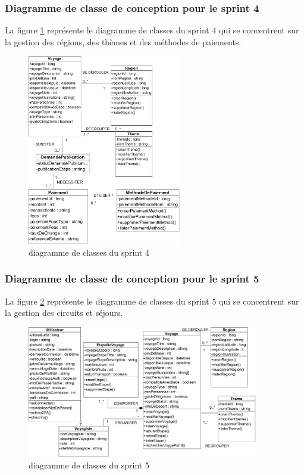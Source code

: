 \documentclass[12pt]{report}
\begin{document}
			\subsubsection{Diagramme de classe de conception pour le sprint 4}
				
			\hspace{15pt} La figure \ref{fig:sprint4} représente le diagramme de classes du sprint 4 qui se concentrent sur la gestion des régions, des thèmes et des méthodes de paiements.


			\begin{figure}[h]
				\centering
				\includegraphics[width=0.6\textwidth]{sprint4.jpg}
				\caption{diagramme de classes du sprint 4}
				\label{fig:sprint4}
			\end{figure}
			\FloatBarrier

			\subsubsection{Diagramme de classe de conception pour le sprint 5}
				
			\hspace{15pt} La figure \ref{fig:sprint5} représente le diagramme de classes du sprint 5 qui se concentrent sur la gestion des circuits
et séjours.


			\begin{figure}[h]
				\centering
				\includegraphics[width=0.9\textwidth]{sprint5.jpg}
				\caption{diagramme de classes du sprint 5}
				\label{fig:sprint5}
			\end{figure}
			\FloatBarrier
\end{document}
